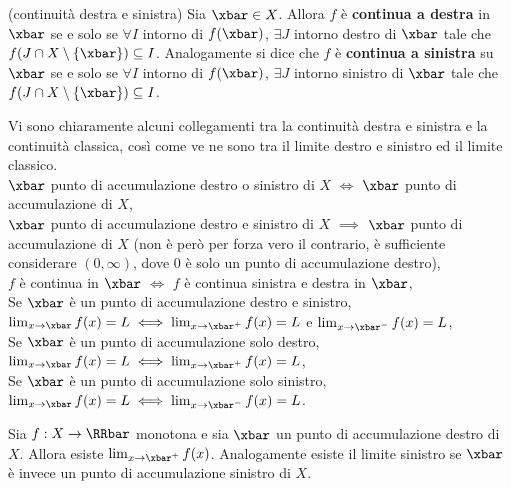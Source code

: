 \documentclass[11pt]{article}
\begin{document}
	\begin{definition}
		(continuità destra e sinistra) Sia $\xbar \in X$. Allora $f$ è \textbf{continua
		a destra} in $\xbar$ se e solo se $\forall I$ intorno di $f(\xbar)$,
		$\exists J$ intorno destro di $\xbar$ tale che $f(J \cap X \setminus \{\xbar\}) \subseteq I$. Analogamente si dice che $f$ è \textbf{continua a sinistra} su $\xbar$ se e solo se $\forall I$ intorno
		di $f(\xbar)$, $\exists J$ intorno sinistro di $\xbar$ tale che
		$f(J \cap X \setminus \{\xbar\}) \subseteq I$.
	\end{definition}

	\begin{remark}
		Vi sono chiaramente alcuni collegamenti tra la continuità destra e sinistra e la continuità classica,
		così come ve ne sono tra il limite destro e sinistro ed il limite classico. \\
		
		\li $\xbar$ punto di accumulazione destro o sinistro di $X$ $\iff$ $\xbar$ punto di accumulazione di $X$, \\
		\li $\xbar$ punto di accumulazione destro e sinistro di $X$ $\implies$ $\xbar$ punto di accumulazione di $X$ (non
		è però per forza vero il contrario, è sufficiente considerare $(0, \infty)$, dove $0$ è solo un punto di
		accumulazione destro), \\
		\li $f$ è continua in $\xbar$ $\iff$ $f$ è continua sinistra e destra in $\xbar$, \\
		\li Se $\xbar$ è un punto di accumulazione destro e sinistro, $\lim_{x \to \xbar} f(x) = L \iff \lim_{x \to \xbar^+} f(x) = L$ e $\lim_{x \to \xbar^-} f(x) = L$, \\
		\li Se $\xbar$ è un punto di accumulazione solo destro, $\lim_{x \to \xbar} f(x) = L \iff \lim_{x \to \xbar^+} f(x) = L$, \\
		\li Se $\xbar$ è un punto di accumulazione solo sinistro, $\lim_{x \to \xbar} f(x) = L \iff \lim_{x \to \xbar^-} f(x) = L$.
	\end{remark}
	
	\begin{proposition}
		Sia $f : X \to \RRbar$ monotona e sia $\xbar$ un punto di
		accumulazione destro di $X$. Allora esiste $\lim_{x \to \xbar^+} f(x)$.
		Analogamente esiste il limite sinistro se $\xbar$ è invece un punto di
		accumulazione sinistro di $X$.
	\end{proposition}
\end{document}

